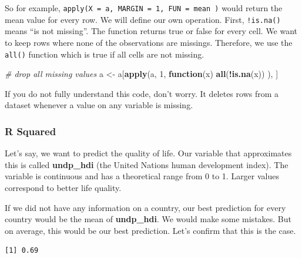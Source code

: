 \documentclass[]{article}
\newenvironment{Shaded}{\begin{snugshade}}{\end{snugshade}}
\newcommand{\KeywordTok}[1]{\textcolor[rgb]{0.13,0.29,0.53}{\textbf{#1}}}
\newcommand{\DataTypeTok}[1]{\textcolor[rgb]{0.13,0.29,0.53}{#1}}
\newcommand{\DecValTok}[1]{\textcolor[rgb]{0.00,0.00,0.81}{#1}}
\newcommand{\StringTok}[1]{\textcolor[rgb]{0.31,0.60,0.02}{#1}}
\newcommand{\CommentTok}[1]{\textcolor[rgb]{0.56,0.35,0.01}{\textit{#1}}}
\newcommand{\ControlFlowTok}[1]{\textcolor[rgb]{0.13,0.29,0.53}{\textbf{#1}}}
\newcommand{\OperatorTok}[1]{\textcolor[rgb]{0.81,0.36,0.00}{\textbf{#1}}}
\newcommand{\NormalTok}[1]{#1}
\theoremstyle{definition}
\theoremstyle{definition}
\theoremstyle{definition}
\theoremstyle{remark}
\begin{document}
So for example, \texttt{apply(X\ =\ a,\ MARGIN\ =\ 1,\ FUN\ =\ mean\ )}
would return the mean value for every row. We will define our own
operation. First, \texttt{!is.na()} means ``is not missing''. The
function returns true or false for every cell. We want to keep rows
where none of the observations are missings. Therefore, we use the
\texttt{all()} function which is true if all cells are not missing.

\begin{Shaded}
\begin{Highlighting}[]
\CommentTok{# drop all missing values}
\NormalTok{a <-}\StringTok{ }\NormalTok{a[}\KeywordTok{apply}\NormalTok{(a, }\DecValTok{1}\NormalTok{, }\ControlFlowTok{function}\NormalTok{(x) }\KeywordTok{all}\NormalTok{(}\OperatorTok{!}\KeywordTok{is.na}\NormalTok{(x)) ), ]}
\end{Highlighting}
\end{Shaded}

If you do not fully understand this code, don't worry. It deletes rows
from a dataset whenever a value on any variable is missing.

\subsubsection{R Squared}\label{r-squared}

Let's say, we want to predict the quality of life. Our variable that
approximates this is called \textbf{undp\_hdi} (the United Nations human
development index). The variable is continuous and has a theoretical
range from 0 to 1. Larger values correspond to better life quality.

If we did not have any information on a country, our best prediction for
every country would be the mean of \textbf{undp\_hdi}. We would make
some mistakes. But on average, this would be our best prediction. Let's
confirm that this is the case.

\begin{Shaded}
\end{Shaded}

\begin{verbatim}
[1] 0.69
\end{verbatim}
\end{document}
